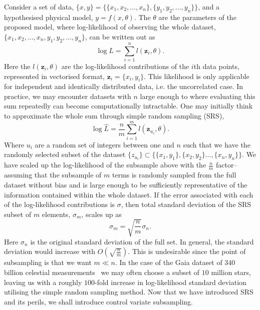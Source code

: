 Consider a set of data, $\{ x,y \}= \{ \{x_1,x_2,...,x_n\}, \{y_1,y_2,...,y_n\} \}$, and a hypothesised physical model, $y= f(x,\theta)$. The $\theta$ are the parameters of the proposed model, where log-likelihood of observing the whole dataset, $\{x_1,x_2,...,x_n,y_1,y_2,...,y_n\}$, can be written out as
\begin{equation}
\log L = \sum_{i=1}^{n} l (\textbf{z}_{i},\theta).
\end{equation}
%
Here the $l (\textbf{z}_{i},\theta)$ are the log-likelihood contributions of the $i$th data points, represented in vectorised format, $\textbf{z}_{i}= \{x_i,y_i\}$. This likelihood is only applicable for independent and identically distributed data, i.e. the uncorrelated case. In practice, we may encounter datasets with $n$ large enough to where evaluating this sum repeatedly can become computationally intractable. One may initially think to approximate the whole sum through simple random sampling (SRS),
%
\begin{equation}
\log \hat{L} = \frac{n}{m} \sum_{i=1}^{m} l ( \textbf{z}_{u_{i}},\theta).
\label{eq:fgf}
\end{equation}
%
Where $u_i$ are a random set of integers between one and $n$ such that we have the randomly selected subset of the dataset $\{ z_{u_{i}} \} \subset \{\{x_1,y_1\},\{x_2,y_2\}...,\{x_n,y_n\}\}$.  We have scaled up the log-likelihood of the subsample above with the $\frac{n}{m}$ factor--assuming that the subsample of $m$ terms is randomly sampled from the full dataset without bias and is large enough to be sufficiently representative of the information contained within the whole dataset. If the error associated with each of the log-likelihood contributions is $\sigma$, then total standard deviation of the SRS subset of $m$ elements, $\sigma_m$, scales up as
%
\begin{equation}
\sigma_m = \sqrt{\frac{n}{m}} \sigma_{n}.
\end{equation}
%
Here $\sigma_{n}$ is the original standard deviation of the full set. In general, the standard deviation would increase with $O(\sqrt{\frac{n}{m}})$. This is undesirable since the point of subsampling is that we want $m \ll n$. In the case of the Gaia dataset of $340$ billion celestial measurements~\cite{2016,https://doi.org/10.48550/arxiv.2208.00211} we may often choose a subset of $10$ million stars, leaving us with a roughly $100$-fold increase in log-likelihood standard deviation utilising the simple random sampling method. Now that we have introduced SRS and its perils, we shall introduce control variate subsampling.

